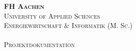 

\begin{titlepage}
  
  \thispagestyle{empty}
  
  \makebox[0pt][l]{
    \begin{picture}(50,50)
      \put(543, -155){
        \hfill
        \texttt{[image: ./images/fh-logo-right.pdf]} %
      }
    \end{picture}
  }

  \begin{center}
    {\Large \textsc{\textbf{FH Aachen}}}\\[0.2cm]
    {\large \textsc{University of Applied Sciences}}\\
    {\large \textsc{Energiewirtschaft \& Informatik (M. Sc.)}}\\[1cm]

    {\Huge \textsc{\textbf{\modulname}}}\\[0.2cm]
    {\Large \textsc{Projektdokumentation}}\\[0.2cm]
    {\textsc{\semester}}\\
  \end{center}


  \vspace{2cm}
  

  \noindent{}

  \end{titlepage}
 
